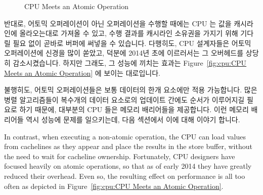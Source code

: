 \begin{figure}[htb]
\centering
{}
\caption{CPU Meets an Atomic Operation}
\end{figure}

반대로, 어토믹 오퍼레이션이 아닌 오퍼레이션을 수행할 때에는 CPU 는 값을
캐시라인에 올라오는대로 가져올 수 있고, 수행 결과를 캐시라인 소유권을 가지기
위해 기다릴 필요 없이 곧바로 버퍼에 써넣을 수 있습니다.
다행히도, CPU 설계자들은 어토믹 오퍼레이션에 신경을 많이 쏟았고, 덕분에 2014년
초에 이르러서는 그 오버헤드를 상당히 감소시켰습니다.
하지만 그래도, 그 성능에 끼치는 효과는
Figure~\ref{fig:cpu:CPU Meets an Atomic Operation} 에 보이는 대로입니다.

불행히도, 어토믹 오퍼레이션들은 보통 데이터의 한개 요소에만 적용 가능합니다.
많은 병렬 알고리즘들이 복수개의 데이터 요소로의 업데이트 간에도 순서가
이루어지길 필요로 하기 때문에, 대부분의 CPU 들은 메모리 배리어들을 제공합니다.
이런 메모리 배리어들 역시 성능에 문제를 일으키는데, 다음 섹션에서 이에 대해
이야기 합니다.
\iffalse

In contrast, when executing a non-atomic operation, the CPU can load
values from cachelines as they appear and place the results in the
store buffer, without the need to wait for cacheline ownership.
Fortunately, CPU designers have focused heavily on atomic operations,
so that as of early 2014 they have greatly reduced their overhead.
Even so, the resulting effect on performance is all too often as depicted in
Figure~\ref{fig:cpu:CPU Meets an Atomic Operation}.

